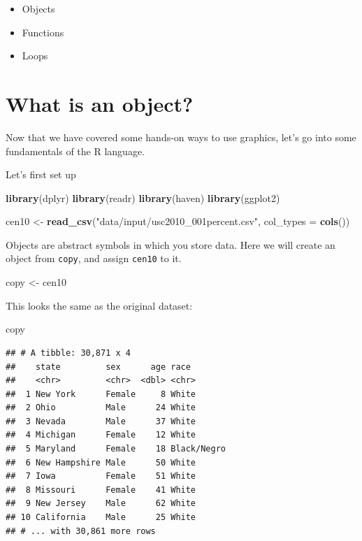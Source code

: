 \documentclass[]{book}
\newenvironment{Shaded}{\begin{snugshade}}{\end{snugshade}}
\newcommand{\KeywordTok}[1]{\textcolor[rgb]{0.13,0.29,0.53}{\textbf{#1}}}
\newcommand{\DataTypeTok}[1]{\textcolor[rgb]{0.13,0.29,0.53}{#1}}
\newcommand{\StringTok}[1]{\textcolor[rgb]{0.31,0.60,0.02}{#1}}
\newcommand{\NormalTok}[1]{#1}
\providecommand{\tightlist}{%
  \setlength{\itemsep}{0pt}\setlength{\parskip}{0pt}}
\theoremstyle{definition}
\theoremstyle{definition}
\theoremstyle{definition}
\theoremstyle{remark}
\begin{document}
\begin{itemize}
\tightlist
\item
  Objects
\item
  Functions
\item
  Loops
\end{itemize}

\section{What is an object?}\label{what-is-an-object}

Now that we have covered some hands-on ways to use graphics, let's go
into some fundamentals of the R language.

Let's first set up

\begin{Shaded}
\begin{Highlighting}[]
\KeywordTok{library}\NormalTok{(dplyr)}
\KeywordTok{library}\NormalTok{(readr)}
\KeywordTok{library}\NormalTok{(haven)}
\KeywordTok{library}\NormalTok{(ggplot2)}
\end{Highlighting}
\end{Shaded}

\begin{Shaded}
\begin{Highlighting}[]
\NormalTok{cen10 <-}\StringTok{ }\KeywordTok{read_csv}\NormalTok{(}\StringTok{"data/input/usc2010_001percent.csv"}\NormalTok{, }\DataTypeTok{col_types =} \KeywordTok{cols}\NormalTok{())}
\end{Highlighting}
\end{Shaded}

Objects are abstract symbols in which you store data. Here we will
create an object from \texttt{copy}, and assign \texttt{cen10} to it.

\begin{Shaded}
\begin{Highlighting}[]
\NormalTok{copy <-}\StringTok{ }\NormalTok{cen10 }
\end{Highlighting}
\end{Shaded}

This looks the same as the original dataset:

\begin{Shaded}
\begin{Highlighting}[]
\NormalTok{copy}
\end{Highlighting}
\end{Shaded}

\begin{verbatim}
## # A tibble: 30,871 x 4
##    state         sex      age race       
##    <chr>         <chr>  <dbl> <chr>      
##  1 New York      Female     8 White      
##  2 Ohio          Male      24 White      
##  3 Nevada        Male      37 White      
##  4 Michigan      Female    12 White      
##  5 Maryland      Female    18 Black/Negro
##  6 New Hampshire Male      50 White      
##  7 Iowa          Female    51 White      
##  8 Missouri      Female    41 White      
##  9 New Jersey    Male      62 White      
## 10 California    Male      25 White      
## # ... with 30,861 more rows
\end{verbatim}
\end{document}
